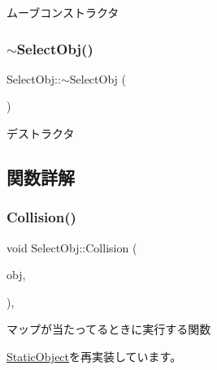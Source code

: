 ムーブコンストラクタ 

\mbox{\label{class_select_obj_a091e4be751b4f828d0780acdd493fa71}} 
\subsubsection{\texorpdfstring{$\sim$\+Select\+Obj()}{~SelectObj()}}
{\footnotesize\ttfamily Select\+Obj\+::$\sim$\+Select\+Obj (\begin{DoxyParamCaption}{ }\end{DoxyParamCaption})\hspace{0.3cm}{\ttfamily [inline]}}



デストラクタ 



\subsection{関数詳解}
\mbox{\label{class_select_obj_a497ff683aefe9bf77201eee1e3948e15}} 
\subsubsection{\texorpdfstring{Collision()}{Collision()}}
{\footnotesize\ttfamily void Select\+Obj\+::\+Collision (\begin{DoxyParamCaption}\item[{\mbox{\hyperlink{class_object_base}{Object\+Base}} $\ast$}]{obj,  }\item[{\mbox{\hyperlink{common_8h_ae148fff5818e9444b4ab2288829559bf}{Vec2}}}]{ }\end{DoxyParamCaption})\hspace{0.3cm}{\ttfamily [final]}, {\ttfamily [virtual]}}



マップが当たってるときに実行する関数 



\mbox{\hyperlink{class_static_object_a64c8803ff881d578d103413e299dbf7f}{Static\+Object}}を再実装しています。

\mbox{\label{class_select_obj_ad3a5fdc41a9e5753f99bae7ad289888f}} 
